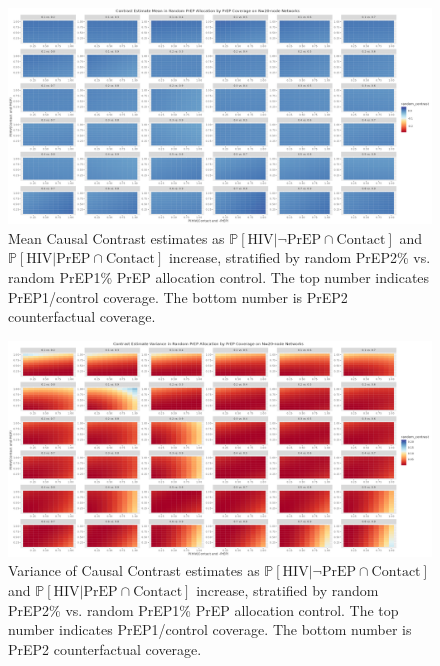 \documentclass{article}
\theoremstyle{definition}
\begin{document}
\begin{figure}[H]
    \centering
    \includegraphics[width=\linewidth]{Corrected Figures/PrEP Random Mean Plots.png}
    \caption{Mean Causal Contrast estimates as $\mathbb{P}\left[\text{HIV} \vert \neg \text{PrEP} \cap \text{Contact}\right]$ and $\mathbb{P}\left[\text{HIV} \vert \text{PrEP} \cap \text{Contact}\right]$ increase, stratified by random PrEP2\% vs. random PrEP1\% PrEP allocation control. The top number indicates PrEP1/control coverage. The bottom number is PrEP2 counterfactual coverage.}
    \label{fig:Figure S4.13}
\end{figure}
\begin{figure}[H]
    \centering
    \includegraphics[width=\linewidth]{Corrected Figures/PrEP Random Variance Plots.png}
    \caption{Variance of Causal Contrast estimates as $\mathbb{P}\left[\text{HIV} \vert \neg \text{PrEP} \cap \text{Contact}\right]$ and $\mathbb{P}\left[\text{HIV} \vert \text{PrEP} \cap \text{Contact}\right]$ increase, stratified by random PrEP2\% vs. random PrEP1\% PrEP allocation control. The top number indicates PrEP1/control coverage. The bottom number is PrEP2 counterfactual coverage.}
    \label{fig:Figure S4.14}
\end{figure}
\end{document}
